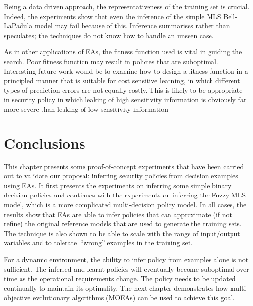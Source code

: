 Being a data driven approach, the representativeness of the training
set is crucial. Indeed, the experiments show that even the inference
of the simple MLS Bell-LaPadula model may fail because of
this. Inference summarises rather than speculates; the techniques do
not know how to handle an unseen case.
 
As in other applications of EAs, the fitness function used is vital in
guiding the search. Poor fitness function may result in policies that
are suboptimal. Interesting future work would be to examine how to
design a fitness function in a principled manner that is suitable for
cost sensitive learning, in which different types of prediction errors
are not equally costly. This is likely to be appropriate in security
policy in which leaking of high sensitivity information is obviously
far more severe than leaking of low sensitivity information.
 
\section{Conclusions}
\label{sec:conclusion5}
This chapter presents some proof-of-concept experiments that have been
carried out to validate our proposal: inferring security policies from
decision examples using EAs. It first presents the experiments on
inferring some simple binary decision policies and continues with the
experiments on inferring the Fuzzy MLS model, which is a more
complicated multi-decision policy model. In all cases, the results
show that EAs are able to infer policies that can approximate (if not
refine) the original reference models that are used to generate the
training sets. The technique is also shown to be able to scale with
the range of input/output variables and to tolerate~``wrong'' examples
in the training set.
 
For a dynamic environment, the ability to infer policy from examples
alone is not sufficient. The inferred and learnt policies will
eventually become suboptimal over time as the operational requirements
change. The policy needs to be updated continually to maintain its
optimality. The next chapter demonstrates how multi-objective
evolutionary algorithms (MOEAs) can be used to achieve this goal.
